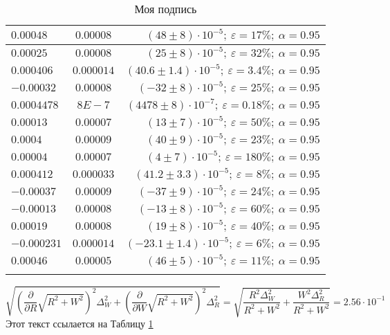\documentclass{article}%
\begin{document}
\begin{longtable}{| l | c | r |}
\hline%
$0.00048$&$0.00008$&$(48 \pm 8) \cdot 10 ^{-5};\:\varepsilon = 17\%; \: \alpha = 0.95$\\%
\hline%
$0.00025$&$0.00008$&$(25 \pm 8) \cdot 10 ^{-5};\:\varepsilon = 32\%; \: \alpha = 0.95$\\%
\hline%
$0.000406$&$0.000014$&$(40.6 \pm 1.4) \cdot 10 ^{-5};\:\varepsilon = 3.4\%; \: \alpha = 0.95$\\%
\hline%
$-0.00032$&$0.00008$&$(-32 \pm 8) \cdot 10 ^{-5};\:\varepsilon = 25\%; \: \alpha = 0.95$\\%
\hline%
$0.0004478$&$8E-7$&$(4478 \pm 8) \cdot 10 ^{-7};\:\varepsilon = 0.18\%; \: \alpha = 0.95$\\%
\hline%
$0.00013$&$0.00007$&$(13 \pm 7) \cdot 10 ^{-5};\:\varepsilon = 50\%; \: \alpha = 0.95$\\%
\hline%
$0.0004$&$0.00009$&$(40 \pm 9) \cdot 10 ^{-5};\:\varepsilon = 23\%; \: \alpha = 0.95$\\%
\hline%
$0.00004$&$0.00007$&$(4 \pm 7) \cdot 10 ^{-5};\:\varepsilon = 180\%; \: \alpha = 0.95$\\%
\hline%
$0.000412$&$0.000033$&$(41.2 \pm 3.3) \cdot 10 ^{-5};\:\varepsilon = 8\%; \: \alpha = 0.95$\\%
\hline%
$-0.00037$&$0.00009$&$(-37 \pm 9) \cdot 10 ^{-5};\:\varepsilon = 24\%; \: \alpha = 0.95$\\%
\hline%
$-0.00013$&$0.00008$&$(-13 \pm 8) \cdot 10 ^{-5};\:\varepsilon = 60\%; \: \alpha = 0.95$\\%
\hline%
$0.00019$&$0.00008$&$(19 \pm 8) \cdot 10 ^{-5};\:\varepsilon = 40\%; \: \alpha = 0.95$\\%
\hline%
$-0.000231$&$0.000014$&$(-23.1 \pm 1.4) \cdot 10 ^{-5};\:\varepsilon = 6\%; \: \alpha = 0.95$\\%
\hline%
$0.00046$&$0.00005$&$(46 \pm 5) \cdot 10 ^{-5};\:\varepsilon = 11\%; \: \alpha = 0.95$\\%
\hline%
\caption{Моя подпись}%
\label{table2}%
\end{longtable}%
\[%
\sqrt{\left(\frac{\partial}{\partial R} \sqrt{R^{2} + W^{2}}\right)^{2} {\Delta}_{W}^{2} + \left(\frac{\partial}{\partial W} \sqrt{R^{2} + W^{2}}\right)^{2} {\Delta}_{R}^{2}} = \sqrt{\frac{R^{2} {\Delta}_{W}^{2}}{R^{2} + W^{2}} + \frac{W^{2} {\Delta}_{R}^{2}}{R^{2} + W^{2}}} = 2.56 \cdot 10 ^{-1}%
\]%
Этот текст ссылается на Таблицу %
\ref{table2}%
\end{document}
